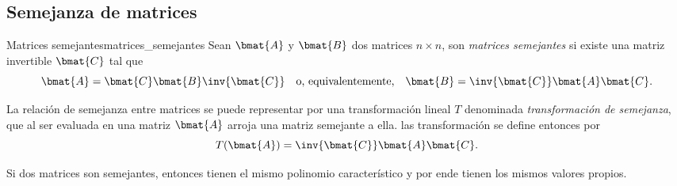 \documentclass{fmbnotes}
\begin{document}
\subsection{Semejanza de matrices}

\begin{definicion}{Matrices semejantes}{matrices_semejantes}
	Sean \(\bmat{A}\) y \(\bmat{B}\) dos matrices \(n\times n\), son \emph{matrices semejantes} si existe una matriz invertible \(\bmat{C}\) tal que
	\[\bmat{A}=\bmat{C}\bmat{B}\inv{\bmat{C}} \quad \text{o, equivalentemente,} \quad \bmat{B}=\inv{\bmat{C}}\bmat{A}\bmat{C}.\]
\end{definicion}

La relación de semejanza entre matrices se puede representar por una transformación lineal \(T\) denominada \emph{transformación de semejanza}, que al ser evaluada en una matriz \(\bmat{A}\) arroja una matriz semejante a ella. las transformación se define entonces por
\[T(\bmat{A})=\inv{\bmat{C}}\bmat{A}\bmat{C}.\]

Si dos matrices son semejantes, entonces tienen el mismo polinomio característico y por ende tienen los mismos valores propios. 
\end{document}
